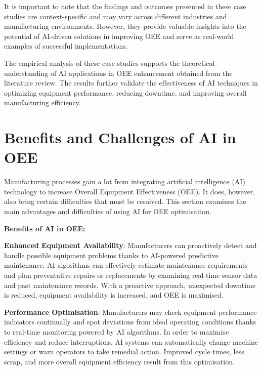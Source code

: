 \documentclass[12pt]{article}
\begin{document}
It is important to note that the findings and outcomes presented in these case studies are context-specific and may vary across different industries and manufacturing environments. However, they provide valuable insights into the potential of AI-driven solutions in improving OEE and serve as real-world examples of successful implementations.

The empirical analysis of these case studies supports the theoretical understanding of AI applications in OEE enhancement obtained from the literature review. The results further validate the effectiveness of AI techniques in optimizing equipment performance, reducing downtime, and improving overall manufacturing efficiency.

\section{Benefits and Challenges of AI in OEE}
Manufacturing processes gain a lot from integrating artificial intelligence (AI) technology to increase Overall Equipment Effectiveness (OEE). It does, however, also bring certain difficulties that must be resolved. This section examines the main advantages and difficulties of using AI for OEE optimisation.

\vspace{0.3cm}
\textbf{Benefits of AI in OEE:}
\vspace{0.3cm}

\textbf{Enhanced Equipment Availability}: Manufacturers can proactively detect and handle possible equipment problems thanks to AI-powered predictive maintenance. AI algorithms can effectively estimate maintenance requirements and plan preventative repairs or replacements by examining real-time sensor data and past maintenance records. With a proactive approach, unexpected downtime is reduced, equipment availability is increased, and OEE is maximised.
\vspace{0.3cm}

\textbf{Performance Optimisation}: Manufacturers may check equipment performance indicators continually and spot deviations from ideal operating conditions thanks to real-time monitoring powered by AI algorithms. In order to maximise efficiency and reduce interruptions, AI systems can automatically change machine settings or warn operators to take remedial action. Improved cycle times, less scrap, and more overall equipment efficiency result from this optimisation.
\vspace{0.3cm}
\end{document}
